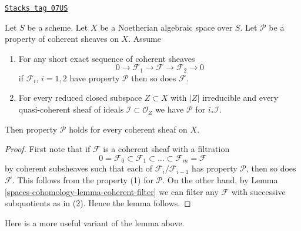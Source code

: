 \begin{lemma}
\label{spaces-cohomology-lemma-property-initial}
\href{https://stacks.math.columbia.edu/tag/07US}{\texttt{Stacks tag 07US}}

Let $S$ be a scheme. Let $X$ be a Noetherian algebraic space over $S$.
Let $\mathcal{P}$ be a property of coherent sheaves on $X$. Assume
\begin{enumerate}
\item For any short exact sequence of coherent sheaves
$$
0 \to \mathcal{F}_1 \to \mathcal{F} \to \mathcal{F}_2 \to 0
$$
if $\mathcal{F}_i$, $i = 1, 2$ have property $\mathcal{P}$
then so does $\mathcal{F}$.
\item For every reduced closed subspace $Z \subset X$ with $|Z|$ irreducible
and every quasi-coherent sheaf of ideals $\mathcal{I} \subset \mathcal{O}_Z$
we have $\mathcal{P}$ for $i_*\mathcal{I}$.
\end{enumerate}
Then property $\mathcal{P}$ holds for every coherent sheaf on $X$.
\end{lemma}

\begin{proof}
First note that if $\mathcal{F}$ is a coherent sheaf with a filtration
$$
0 = \mathcal{F}_0 \subset \mathcal{F}_1 \subset
\ldots \subset \mathcal{F}_m = \mathcal{F}
$$
by coherent subsheaves such that each of $\mathcal{F}_i/\mathcal{F}_{i - 1}$
has property $\mathcal{P}$, then so does $\mathcal{F}$.
This follows from the property (1) for $\mathcal{P}$.
On the other hand, by Lemma \ref{spaces-cohomology-lemma-coherent-filter}
we can filter any $\mathcal{F}$
with successive subquotients as in (2).
Hence the lemma follows.
\end{proof}

Here is a more useful variant of the lemma above.

